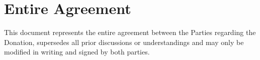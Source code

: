 
\section{Entire Agreement}
\label{sec:agreement}

This document represents the entire agreement between the Parties regarding the Donation, supersedes all prior discussions or understandings and may only be modified in writing and signed by both parties.

